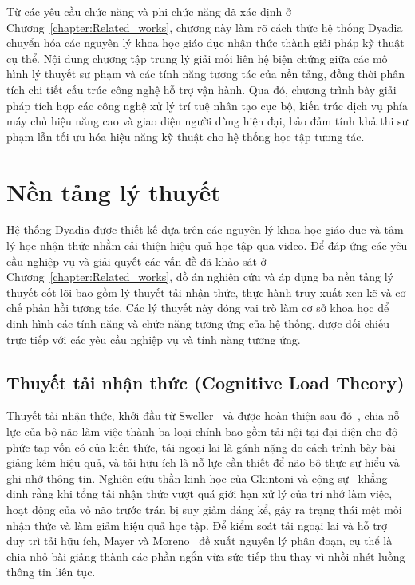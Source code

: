 \documentclass[../DoAn.tex]{subfiles}
\begin{document}
Từ các yêu cầu chức năng và phi chức năng đã xác định ở Chương~\ref{chapter:Related_works}, chương này làm rõ cách thức hệ thống Dyadia chuyển hóa các nguyên lý khoa học giáo dục nhận thức thành giải pháp kỹ thuật cụ thể. Nội dung chương tập trung lý giải mối liên hệ biện chứng giữa các mô hình lý thuyết sư phạm và các tính năng tương tác của nền tảng, đồng thời phân tích chi tiết cấu trúc công nghệ hỗ trợ vận hành. Qua đó, chương trình bày giải pháp tích hợp các công nghệ xử lý trí tuệ nhân tạo cục bộ, kiến trúc dịch vụ phía máy chủ hiệu năng cao và giao diện người dùng hiện đại, bảo đảm tính khả thi sư phạm lẫn tối ưu hóa hiệu năng kỹ thuật cho hệ thống học tập tương tác.

\section{Nền tảng lý thuyết}
\label{section:3.1}
Hệ thống Dyadia được thiết kế dựa trên các nguyên lý khoa học giáo dục và tâm lý học nhận thức nhằm cải thiện hiệu quả học tập qua video. Để đáp ứng các yêu cầu nghiệp vụ và giải quyết các vấn đề đã khảo sát ở Chương~\ref{chapter:Related_works}, đồ án nghiên cứu và áp dụng ba nền tảng lý thuyết cốt lõi bao gồm lý thuyết tải nhận thức, thực hành truy xuất xen kẽ và cơ chế phản hồi tương tác. Các lý thuyết này đóng vai trò làm cơ sở khoa học để định hình các tính năng và chức năng tương ứng của hệ thống, được đối chiếu trực tiếp với các yêu cầu nghiệp vụ và tính năng tương ứng.

\subsection{Thuyết tải nhận thức (Cognitive Load Theory)}
\label{subsection:3.1.1}
Thuyết tải nhận thức, khởi đầu từ Sweller~\cite{sweller1988cognitive} và được hoàn thiện sau đó~\cite{sweller1998cognitive}, chia nỗ lực của bộ não làm việc thành ba loại chính bao gồm tải nội tại đại diện cho độ phức tạp vốn có của kiến thức, tải ngoại lai là gánh nặng do cách trình bày bài giảng kém hiệu quả, và tải hữu ích là nỗ lực cần thiết để não bộ thực sự hiểu và ghi nhớ thông tin. Nghiên cứu thần kinh học của Gkintoni và cộng sự~\cite{gkintoni2025challenging} khẳng định rằng khi tổng tải nhận thức vượt quá giới hạn xử lý của trí nhớ làm việc, hoạt động của vỏ não trước trán bị suy giảm đáng kể, gây ra trạng thái mệt mỏi nhận thức và làm giảm hiệu quả học tập. Để kiểm soát tải ngoại lai và hỗ trợ duy trì tải hữu ích, Mayer và Moreno~\cite{mayer2003nine} đề xuất nguyên lý phân đoạn, cụ thể là chia nhỏ bài giảng thành các phần ngắn vừa sức tiếp thu thay vì nhồi nhét luồng thông tin liên tục.
\end{document}
